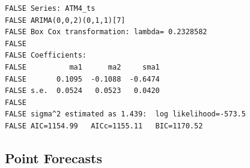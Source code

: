 \documentclass[openany]{book}
\begin{document}
\begin{verbatim}
FALSE Series: ATM4_ts 
FALSE ARIMA(0,0,2)(0,1,1)[7] 
FALSE Box Cox transformation: lambda= 0.2328582 
FALSE 
FALSE Coefficients:
FALSE          ma1      ma2     sma1
FALSE       0.1095  -0.1088  -0.6474
FALSE s.e.  0.0524   0.0523   0.0420
FALSE 
FALSE sigma^2 estimated as 1.439:  log likelihood=-573.5
FALSE AIC=1154.99   AICc=1155.11   BIC=1170.52
\end{verbatim}

\hypertarget{forecast-a}{%
\subsection*{Point Forecasts}\label{forecast-a}}

\begin{table}[H]


\end{table}
\end{document}
